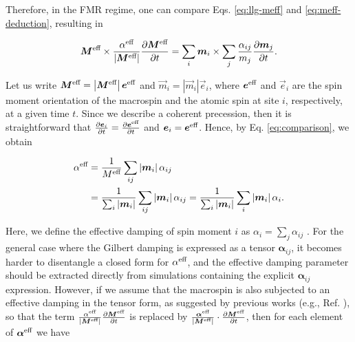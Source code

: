 Therefore, in the FMR regime, one can compare Eqs. \ref{eq:llg-meff} and \ref{eq:meff-deduction}, resulting in 

\begin{equation}\label{eq:comparison}
\vec{M}^{\textnormal{eff}} \times \frac{\alpha^{\textnormal{eff}}}{\left|\vec{M}^{\textnormal{eff}}\right|}\frac{\partial \vec{M}^{\textnormal{eff}}}{\partial t}  = \sum_i\vec{m}_i\times\sum_j \frac{\alpha_{ij}}{m_j} \frac{\partial \vec{m}_j}{\partial t} . 
\end{equation}

Let us write $\vec{M}^{\textnormal{eff}} = \left|\vec{M}^{\textnormal{eff}}\right|\vec{e}^{\textnormal{eff}} $ and $\vec{m}_i = \left|\vec{m}_i\right|\vec{e}_i$, where $\vec{e}^{\textnormal{eff}}$ and $\vec{e}_i$ are the spin moment orientation of the macrospin and the atomic spin at site $i$, respectively, at a given time $t$. Since we describe a coherent precession, then it is straightforward that $\frac{\partial \vec{e}_i}{\partial t}=\frac{\partial \vec{e}^{\textnormal{eff}}}{\partial t}$ and $\vec{e}_i=\vec{e}^{\textnormal{eff}}$. Hence, by Eq. \ref{eq:comparison}, we obtain 

\begin{align}\label{eq:effective-alpha-parameter}
\alpha^{\textnormal{eff}}&=\frac{1}{M^{\textnormal{eff}}}\sum_{ij} \left|\vec{m}_i \right|\alpha_{ij} \nonumber \\ 
&= \frac{1}{\sum_i \left|\vec{m}_i \right| } \sum_{ij} \left|\vec{m}_i \right|\alpha_{ij} = \frac{1}{\sum_i \left|\vec{m}_i \right| } \sum_{i}\left|\vec{m}_i \right|\alpha_i.
\end{align}

Here, we define the effective damping of spin moment $i$ as $\alpha_i=\sum_j{\alpha_{ij}}$ \cite{PhysRevB.108.014433}. For the general case where the Gilbert damping is expressed as a tensor $\boldsymbol{\alpha}_{ij}$, it becomes harder to disentangle a closed form for $\alpha^{\textnormal{eff}}$, and the effective damping parameter should be extracted directly from simulations containing the explicit $\boldsymbol{\alpha}_{ij}$ expression. However, if we assume that the macrospin is also subjected to an effective damping in the tensor form, as suggested by previous works (e.g., Ref. \cite{PhysRevB.72.064450,PhysRevB.84.172403}), so that the term $\frac{\alpha^{\textnormal{eff}}}{\left|\vec{M}^{\textnormal{eff}}\right|}\frac{\partial \vec{M}^{\textnormal{eff}}}{\partial t}$ is replaced by $\frac{\boldsymbol{\alpha}^{\textnormal{eff}}}{\left|\vec{M}^{\textnormal{eff}}\right|}\cdot\frac{\partial \vec{M}^{\textnormal{eff}}}{\partial t}$, then for each element of $\boldsymbol{\alpha}^{\textnormal{eff}}$ we have

